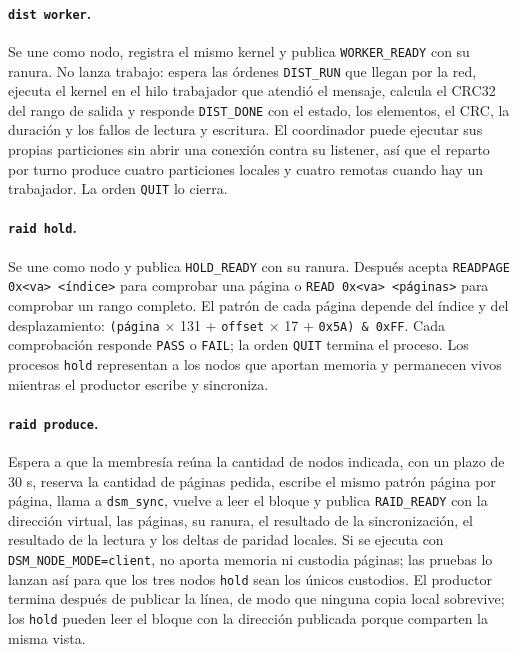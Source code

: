 \paragraph{\texttt{dist worker}.} Se une como nodo, registra el mismo kernel y publica \texttt{WORKER\_READY} con su ranura. No lanza trabajo: espera las órdenes \texttt{DIST\_RUN} que llegan por la red, ejecuta el kernel en el hilo trabajador que atendió el mensaje, calcula el CRC32 del rango de salida y responde \texttt{DIST\_DONE} con el estado, los elementos, el CRC, la duración y los fallos de lectura y escritura. El coordinador puede ejecutar sus propias particiones sin abrir una conexión contra su listener, así que el reparto por turno produce cuatro particiones locales y cuatro remotas cuando hay un trabajador. La orden \texttt{QUIT} lo cierra.

\paragraph{\texttt{raid hold}.} Se une como nodo y publica \texttt{HOLD\_READY} con su ranura. Después acepta \texttt{READPAGE 0x<va> <índice>} para comprobar una página o \texttt{READ 0x<va> <páginas>} para comprobar un rango completo. El patrón de cada página depende del índice y del desplazamiento: \texttt{(página} $\times$ 131 + \texttt{offset} $\times$ 17 + \texttt{0x5A) \& 0xFF}. Cada comprobación responde \texttt{PASS} o \texttt{FAIL}; la orden \texttt{QUIT} termina el proceso. Los procesos \texttt{hold} representan a los nodos que aportan memoria y permanecen vivos mientras el productor escribe y sincroniza.

\paragraph{\texttt{raid produce}.} Espera a que la membresía reúna la cantidad de nodos indicada, con un plazo de 30 s, reserva la cantidad de páginas pedida, escribe el mismo patrón página por página, llama a \texttt{dsm\_sync}, vuelve a leer el bloque y publica \texttt{RAID\_READY} con la dirección virtual, las páginas, su ranura, el resultado de la sincronización, el resultado de la lectura y los deltas de paridad locales. Si se ejecuta con \texttt{DSM\_NODE\_MODE=client}, no aporta memoria ni custodia páginas; las pruebas lo lanzan así para que los tres nodos \texttt{hold} sean los únicos custodios. El productor termina después de publicar la línea, de modo que ninguna copia local sobrevive; los \texttt{hold} pueden leer el bloque con la dirección publicada porque comparten la misma vista.

